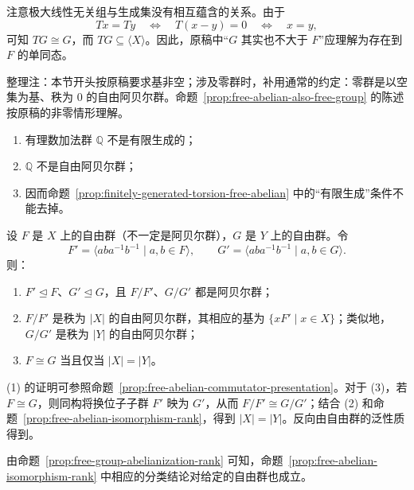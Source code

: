 \begin{purplenote}
注意极大线性无关组与生成集没有相互蕴含的关系。由于
\[
  Tx=Ty\quad\Longleftrightarrow\quad T(x-y)=0
  \quad\Longleftrightarrow\quad x=y,
\]
可知 $TG\cong G$，而 $TG\subseteq\langle X\rangle$。因此，原稿中“$G$ 其实也不大于 $F$”应理解为存在到 $F$ 的单同态。

整理注：本节开头按原稿要求基非空；涉及零群时，补用通常的约定：零群是以空集为基、秩为 $0$ 的自由阿贝尔群。命题~\ref{prop:free-abelian-also-free-group} 的陈述按原稿的非零情形理解。
\end{purplenote}

\begin{proposition}\label{prop:rationals-not-free-abelian}
\begin{enumerate}[label=(\arabic*)]
  \item 有理数加法群 $\mathbb Q$ 不是有限生成的；
  \item $\mathbb Q$ 不是自由阿贝尔群；
  \item 因而命题~\ref{prop:finitely-generated-torsion-free-abelian} 中的“有限生成”条件不能去掉。
\end{enumerate}
\end{proposition}

\noindent\begin{minipage}{\linewidth}
\setlength{\parskip}{0.65\baselineskip}
\begin{proposition}\label{prop:free-group-abelianization-rank}
设 $F$ 是 $X$ 上的自由群（不一定是阿贝尔群），$G$ 是 $Y$ 上的自由群。令
\[
  F'=\langle aba^{-1}b^{-1}\mid a,b\in F\rangle,
  \qquad
  G'=\langle aba^{-1}b^{-1}\mid a,b\in G\rangle.
\]
则：
\begin{enumerate}[label=(\arabic*)]
  \item $F'\trianglelefteq F$、$G'\trianglelefteq G$，且 $F/F'$、$G/G'$ 都是阿贝尔群；
  \item $F/F'$ 是秩为 $|X|$ 的自由阿贝尔群，其相应的基为 $\{xF'\mid x\in X\}$；类似地，$G/G'$ 是秩为 $|Y|$ 的自由阿贝尔群；
  \item $F\cong G$ 当且仅当 $|X|=|Y|$。
\end{enumerate}
\end{proposition}

\begin{purplenote}
(1) 的证明可参照命题~\ref{prop:free-abelian-commutator-presentation}。对于 (3)，若 $F\cong G$，则同构将换位子子群 $F'$ 映为 $G'$，从而 $F/F'\cong G/G'$；结合 (2) 和命题~\ref{prop:free-abelian-isomorphism-rank}，得到 $|X|=|Y|$。反向由自由群的泛性质得到。

由命题~\ref{prop:free-group-abelianization-rank} 可知，命题~\ref{prop:free-abelian-isomorphism-rank} 中相应的分类结论对给定的自由群也成立。
\end{purplenote}
\end{minipage}\par
